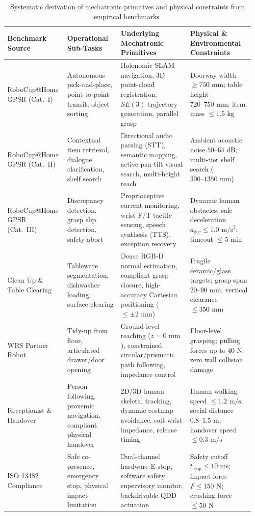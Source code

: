 \begin{table}[htbp]
\centering\small
\caption{Systematic derivation of mechatronic primitives and physical constraints from empirical benchmarks.}
\label{tab:benchmark_mapping}
\begin{tabularx}{\textwidth}{@{}lYYY@{}}
\toprule
\textbf{Benchmark Source} & \textbf{Operational Sub-Tasks} & \textbf{Underlying Mechatronic Primitives} & \textbf{Physical \& Environmental Constraints} \\
\midrule
RoboCup@Home GPSR (Cat.~I)~\cite{robocupathome} & Autonomous pick-and-place, point-to-point transit, object sorting & Holonomic SLAM navigation, 3D point-cloud registration, $SE(3)$ trajectory generation, parallel grasp & Doorway width $\ge 750\text{ mm}$; table height $720\text{--}750\text{ mm}$; item mass $\le 1.5\text{ kg}$ \\
\addlinespace[0.4em]
RoboCup@Home GPSR (Cat.~II)~\cite{robocupathome} & Contextual item retrieval, dialogue clarification, shelf search & Directional audio parsing (STT), semantic mapping, active pan-tilt visual search, multi-height reach & Ambient acoustic noise $50\text{--}65\text{ dB}$; multi-tier shelf search ($300\text{--}1350\text{ mm}$) \\
\addlinespace[0.4em]
RoboCup@Home GPSR (Cat.~III)~\cite{robocupathome} & Discrepancy detection, grasp slip detection, safety abort & Proprioceptive current monitoring, wrist F/T tactile sensing, speech synthesis (TTS), exception recovery & Dynamic human obstacles; safe deceleration $a_{\text{dec}} \le 1.0\text{ m/s}^2$; timeout $\le 5\text{ min}$ \\
\addlinespace[0.4em]
Clean Up \& Table Clearing~\cite{robocupathome} & Tableware segmentation, dishwasher loading, surface clearing & Dense RGB-D normal estimation, compliant grasp closure, high-accuracy Cartesian positioning ($\le \pm 2\text{ mm}$) & Fragile ceramic/glass targets; grasp span $20\text{--}90\text{ mm}$; vertical clearance $\le 350\text{ mm}$ \\
\addlinespace[0.4em]
WRS Partner Robot~\cite{wrs} & Tidy-up from floor, articulated drawer/door opening & Ground-level reaching ($z = 0\text{ mm}$), constrained circular/prismatic path following, impedance control & Floor-level grasping; pulling forces up to $40\text{ N}$; zero wall collision damage \\
\addlinespace[0.4em]
Receptionist \& Handover~\cite{robocupathome} & Person following, proxemic navigation, compliant physical handover & 2D/3D human skeletal tracking, dynamic costmap avoidance, soft wrist impedance, release timing & Human walking speed $\le 1.2\text{ m/s}$; social distance $0.8\text{--}1.5\text{ m}$; handover speed $\le 0.3\text{ m/s}$ \\
\addlinespace[0.4em]
ISO 13482 Compliance~\cite{iso13482} & Safe co-presence, emergency stop, physical impact limitation & Dual-channel hardware E-stop, software safety supervisory monitor, backdrivable QDD actuation & Safety cutoff $t_{\text{stop}} \le 10\text{ ms}$; impact force $F \le 150\text{ N}$; crushing force $\le 50\text{ N}$ \\
\bottomrule
\end{tabularx}
\end{table}


